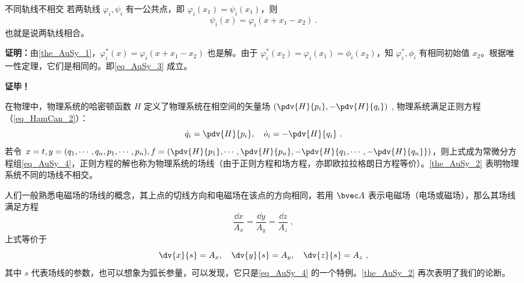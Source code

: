 \begin{theorem}{不同轨线不相交}\label{the_AuSy_2}
若两轨线 $\varphi_i,\psi_i$ 有一公共点，即 $\varphi_i(x_1)=\psi_i(x_1)$，则
\begin{equation}\label{eq_AuSy_3}
\psi_i(x)=\varphi_i(x+x_1-x_2)~.
\end{equation}
也就是说两轨线相合。
\end{theorem}
\textbf{证明：}由\autoref{the_AuSy_1}，$\varphi^*_i(x)=\varphi_i(x+x_1-x_2)$ 也是解。由于 $\varphi^*_i(x_2)=\varphi_i(x_1)=\phi_i(x_2)$，知 $\varphi^*_i,\phi_i$ 有相同初始值 $x_2$。根据唯一性定理，它们是相同的。即\autoref{eq_AuSy_3} 成立。

\textbf{证毕！}

在物理中，物理系统的哈密顿函数 $H$ 定义了物理系统在相空间的矢量场 $(\pdv{H}{p_i},-\pdv{H}{q_i})$ , 物理系统满足正则方程（\autoref{eq_HamCan_2}）：
\begin{equation}
\dot q_i=\pdv{H}{p_i},\quad \dot o_i=-\pdv{H}{q_i}~.
\end{equation}
若令 $x=t,y=(q_1,\cdots,q_n,p_1,\cdots,p_n),f=(\pdv{H}{p_1},\cdots,\pdv{H}{p_n},-\pdv{H}{q_1,\cdots,-\pdv{H}{q_n}})$，则上式成为常微分方程组\autoref{eq_AuSy_4}，正则方程的解也称为物理系统的场线（由于正则方程和场方程，亦即欧拉拉格朗日方程等价）。\autoref{the_AuSy_2} 表明物理系统不同的场线不相交。

人们一般熟悉电磁场的场线的概念，其上点的切线方向和电磁场在该点的方向相同，若用 $\bvec A$ 表示电磁场（电场或磁场），那么其场线满足方程
\begin{equation}
\frac{\dd x}{A_x}=\frac{\dd y}{A_y}=\frac{\dd z}{A_z}~,
\end{equation}
上式等价于
\begin{equation}
\dv{x}{s}=A_x,\quad\dv{y}{s}=A_y,\quad\dv{z}{s}=A_z~,
\end{equation}
其中 $s$ 代表场线的参数，也可以想象为弧长参量，可以发现，它只是\autoref{eq_AuSy_4} 的一个特例。\autoref{the_AuSy_2} 再次表明了我们的论断。
